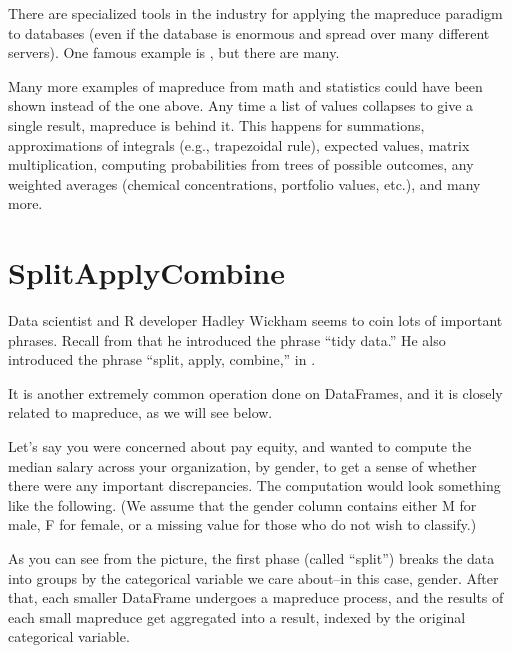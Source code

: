 \documentclass[letterpaper,10pt,english]{sphinxmanual}
\begin{document}
There are specialized tools in the industry for applying the map\sphinxhyphen{}reduce paradigm to databases (even if the database is enormous and spread over many different servers).  One famous example is , but there are many.

Many more examples of map\sphinxhyphen{}reduce from math and statistics could have been shown instead of the one above.  Any time a list of values collapses to give a single result, map\sphinxhyphen{}reduce is behind it.  This happens for summations, approximations of integrals (e.g., trapezoidal rule), expected values, matrix multiplication, computing probabilities from trees of possible outcomes, any weighted averages (chemical concentrations, portfolio values, etc.), and many more.


\section{Split\sphinxhyphen{}Apply\sphinxhyphen{}Combine}
\label{\detokenize{chapter-11-processing-rows:split-apply-combine}}
Data scientist and R developer Hadley Wickham seems to coin lots of important phrases.  Recall from {\hyperref[\detokenize{chapter-5-before-and-after::doc}]{}} that he introduced the phrase “tidy data.”  He also introduced the phrase “split, apply, combine,” in .

It is another extremely common operation done on DataFrames, and it is closely related to map\sphinxhyphen{}reduce, as we will see below.

Let’s say you were concerned about pay equity, and wanted to compute the median salary across your organization, by gender, to get a sense of whether there were any important discrepancies.  The computation would look something like the following.  (We assume that the gender column contains either M for male, F for female, or a missing value for those who do not wish to classify.)


As you can see from the picture, the first phase (called “split”) breaks the data into groups by the categorical variable we care about–in this case, gender.  After that, each smaller DataFrame undergoes a map\sphinxhyphen{}reduce process, and the results of each small map\sphinxhyphen{}reduce get aggregated into a result, indexed by the original categorical variable.
\end{document}
